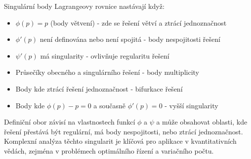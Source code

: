 Singulární body Lagrangeovy rovnice nastávají když:
\begin{itemize}
\item $\phi(p) = p$ (body větvení) - zde se řešení větví a ztrácí jednoznačnost
\item $\phi'(p)$ není definována nebo není spojitá - body nespojitosti řešení
\item $\psi'(p)$ má singularity - ovlivňuje regularitu řešení
\item Průsečíky obecného a singulárního řešení - body multiplicity
\item Body kde ztrácí řešení jednoznačnost - bifurkace řešení
\item Body kde $\phi(p) - p = 0$ a současně $\phi'(p) = 0$ - vyšší singularity
\end{itemize}

Definiční obor závisí na vlastnostech funkcí $\phi$ a $\psi$ a může obsahovat oblasti, kde řešení přestává být regulární, má body nespojitosti, nebo ztrácí jednoznačnost. Komplexní analýza těchto singularit je klíčová pro aplikace v kvantitativních vědách, zejména v problémech optimálního řízení a variačního počtu.